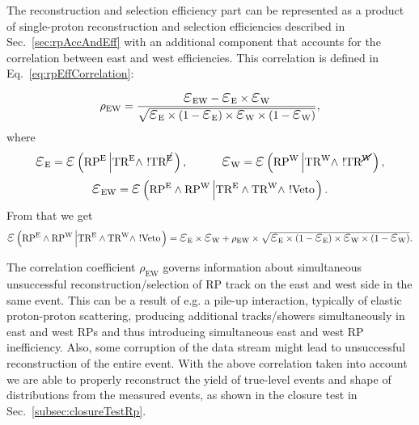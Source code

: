 The reconstruction and selection efficiency part can be represented as a product of single-proton reconstruction and selection efficiencies described in Sec.~\ref{sec:rpAccAndEff} with an additional component that accounts for the correlation between east and west efficiencies. This correlation is defined in Eq.~\eqref{eq:rpEffCorrelation}:


\begin{equation}\label{eq:rpEffCorrelation}
 \rho_{\text{EW}} = 
 \frac{\mbox{\LARGE$\varepsilon$}_{\text{EW}} - \mbox{\LARGE$\varepsilon$}_{\text{E}} \times \mbox{\LARGE$\varepsilon$}_{\text{W}} }
 { \sqrt{ \mbox{\LARGE$\varepsilon$}_{\text{E}} \times (1-\mbox{\LARGE$\varepsilon$}_{\text{E}}) \times \mbox{\LARGE$\varepsilon$}_{\text{W}} \times (1-\mbox{\LARGE$\varepsilon$}_{\text{W}}) } },
\end{equation}
where \[\mbox{\LARGE$\varepsilon$}_{\text{E}} = \mbox{\LARGE$\varepsilon$}\left(\RPE\left|\TRE\land~!\TRNE\right.\right),~~~~~~~~~\mbox{\LARGE$\varepsilon$}_{\text{W}} = \mbox{\LARGE$\varepsilon$}\left(\RPW\left|\TRW\land~!\TRNW\right.\right),\] \[\mbox{\LARGE$\varepsilon$}_{\text{EW}} = \mbox{\LARGE$\varepsilon$}\left(\RPE\land\RPW\left|\TRE\land\TRW\land~!\V\right.\right).\]%
%
From that we get%
\begin{equation}
\mbox{\LARGE$\varepsilon$}\left(\RPE\land\RPW\left|\TRE\land\TRW\land~!\V\right.\right)=\mbox{\LARGE$\varepsilon$}_{\text{E}} \times \mbox{\LARGE$\varepsilon$}_{\text{W}} + \rho_{\text{EW}}\times \sqrt{ \mbox{\LARGE$\varepsilon$}_{\text{E}} \times (1-\mbox{\LARGE$\varepsilon$}_{\text{E}}) \times \mbox{\LARGE$\varepsilon$}_{\text{W}} \times (1-\mbox{\LARGE$\varepsilon$}_{\text{W}}) }.
\end{equation}

The correlation coefficient $\rho_{\text{EW}}$ governs information about simultaneous unsuccessful reconstruction/selection of RP track on the east and west side in the same event. This can be a result of e.g. a pile-up interaction, typically of elastic proton-proton scattering, producing additional tracks/showers simultaneously in east and west RPs and thus introducing simultaneous east and west RP inefficiency. Also, some corruption of the data stream might lead to unsuccessful reconstruction of the entire event. With the above correlation taken into account we are able to properly reconstruct the yield of true-level events and shape of distributions from the measured events, as shown in the closure test in Sec.~\ref{subsec:closureTestRp}.


